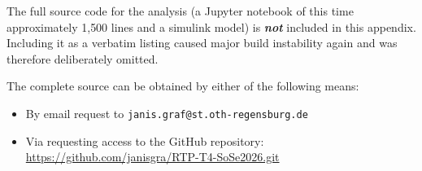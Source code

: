 \documentclass[12pt, oneside, a4paper]{scrreprt}
\begin{document}

                \begin{tcolorbox}[
                    colback=red!10,
                    colframe=red!70!black,
                    title=\textbf{Editorial note — Source code omitted},
                    fonttitle=\bfseries,
                    sharp corners=south,
                ]
                    The full source code for the analysis (a Jupyter notebook of this time approximately 1{,}500 lines and a simulink model) is \textbf{\emph{not}} included in this appendix. Including it as a verbatim listing caused major build instability again and was therefore deliberately omitted.

                    The complete source can be obtained by either of the following means:
                    \begin{itemize}
                        \item By email request to \texttt{janis.graf@st.oth-regensburg.de}
                        \item Via requesting access to the GitHub repository: \url{https://github.com/janisgra/RTP-T4-SoSe2026.git}
                    \end{itemize}
                \end{tcolorbox}
        
        \printbibliography

\end{document}
